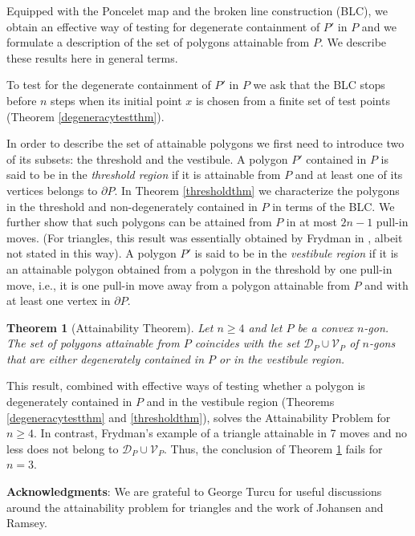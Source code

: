 \documentclass[11pt]{amsart}
\newtheorem{theorem}{Theorem}[section]
\theoremstyle{remark}
\numberwithin{equation}{section}
\newcommand{\D}{\mathcal{D}}
\newcommand{\V}{\mathcal{V}}
\renewcommand{\geq}{\geqslant}
\begin{document}
Equipped with the Poncelet map and the broken line construction (BLC), we obtain an effective way of testing for degenerate containment of $P'$ in $P$ and we formulate a description of the set of polygons attainable from $P$. We describe these results here in general terms.  

To test for the degenerate containment  of $P'$ in $P$ we ask that the BLC stops before $n$ steps when its initial  point $x$ is chosen from a finite set of test points (Theorem \ref{degeneracytestthm}). 

In order to describe the set of attainable polygons we first need to introduce two of its subsets:  the threshold and the vestibule. A polygon $P'$ contained in $P$ is said to be in the {\it threshold region}  if it is attainable from $P$ and at least one of its vertices belongs to $\partial P$. In Theorem \ref{thresholdthm} we characterize the polygons in the threshold and non-degenerately contained in $P$ in terms of the BLC. We further show that such polygons  can be attained from $P$ in at most $2n-1$ pull-in moves. (For triangles, this result was essentially obtained by Frydman in \cite[Theorem 3.1]{frydman80}, albeit not stated in this way). 
A polygon $P'$ is said to be in the {\it vestibule region} if it is an  attainable polygon  obtained from a polygon in the threshold by one pull-in move,  i.e., it is one pull-in move away from a polygon attainable from $P$ and with at least one vertex in $\partial P$. 

\begin{theorem}[Attainability Theorem]\label{mainattainable}
Let $n\geq 4$ and let $P$ be a convex $n$-gon. The set of polygons attainable from $P$ coincides with the set $\D_P\cup\V_P$ of $n$-gons that are either degenerately contained in $P$ or in the vestibule region.
\end{theorem}

This result,  combined with effective ways of testing whether a polygon is degenerately contained in $P$ and in the vestibule region (Theorems \ref{degeneracytestthm} and \ref{thresholdthm}), solves the Attainability Problem for $n\geq 4$. 
In contrast, Frydman's example of a triangle attainable in 7 moves and no less  does  not belong to $\D_P\cup\V_P$. Thus, the conclusion of Theorem \ref{mainattainable} fails for $n=3$.




\textbf{Acknowledgments}: We are grateful to George Turcu for useful discussions around the attainability problem for triangles
and the work of Johansen and Ramsey.
\end{document}
